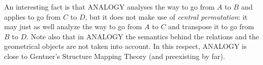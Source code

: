 An interesting fact is that ANALOGY analyses the way to go from $A$ to $B$ and
applies to go from $C$ to $D$, but it does not make use of \textit{central
permutation}: it may just as well analyze the way to go from $A$ to $C$ and
transpose it to go from $B$ to $D$. Note also that in ANALOGY the semantics
behind the relations and the geometrical objects are not taken into account. In
this respect, ANALOGY is close to Gentner's Structure Mapping Theory (and
preexisting by far).


